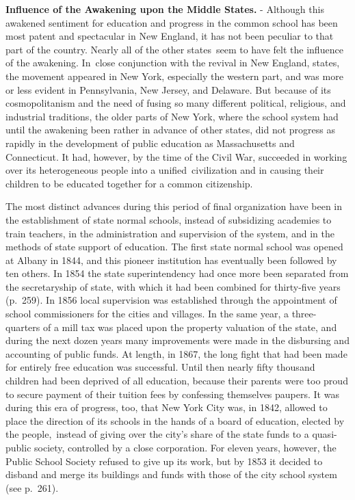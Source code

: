 \documentclass[
]{book}
\begin{document}
\textbf{Influence of the Awakening upon the Middle States.} - Although this awakened sentiment for education and progress in the common school has been most patent and spectacular in New England, it has not been peculiar to that part of the country. Nearly all of the other states~seem to have felt the influence of the awakening. In~close conjunction with the revival in New England, states, the movement appeared in New York, especially the western part, and was more or less evident in Pennsylvania, New Jersey, and Delaware. But because of its cosmopolitanism and the need of fusing so many different political, religious, and industrial traditions, the older parts of New York, where the school system had until the awakening been rather in advance of other states, did not progress as rapidly in the development of public education as Massachusetts and Connecticut. It had, however, by the time of the Civil War, succeeded in working over its heterogeneous people into a unified~civilization and in causing their children to be educated together for a common citizenship.

The most distinct advances during this period of final organization have been in the establishment of state normal schools, instead of subsidizing academies to train teachers, in the administration and supervision of the system, and in the methods of state support of education. The first state normal school was opened at Albany in 1844, and this pioneer institution has eventually been followed by ten others. In 1854 the state superintendency had once more been separated from the secretaryship of state, with which it had been combined for thirty-five years (p.~259). In 1856 local supervision was established through the appointment of school commissioners for the cities and villages. In the same year, a three-quarters of a mill tax was placed upon the property valuation of the state, and during the next dozen years many improvements were made in the disbursing and accounting of public funds. At length, in 1867, the long fight that had been made for entirely free education was successful. Until then nearly fifty thousand children had been deprived of all education, because their parents were too proud to secure payment of their tuition fees by confessing themselves paupers. It was during this era of progress, too, that New York City was, in 1842, allowed to place the direction of its schools in the hands of a board of education, elected by the people,~instead of giving over the city's share of the state funds to a quasi-public society, controlled by a close corporation. For eleven years, however, the Public School Society refused to give up its work, but by 1853 it decided to disband and merge its buildings and funds with those of the city school system (see p.~261).
\end{document}
